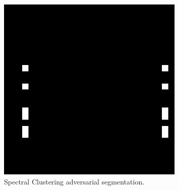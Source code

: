 \documentclass{beamer}
\begin{document}
\begin{frame}
\begin{figure}[H]
	\hspace{.1cm}
	\begin{minipage}[t]{0.3\linewidth}
		\centering
		\includegraphics[width=0.8\textwidth]{img/advrows/5advy.png}
		\caption{\small Spectral Clustering adversarial segmentation.}
	\end{minipage}
\end{figure}
\end{frame}
\end{document}
